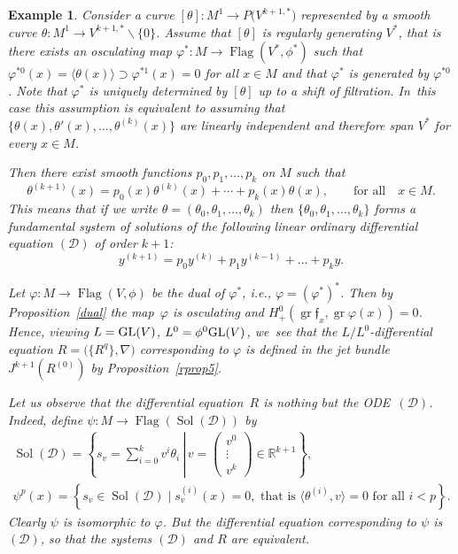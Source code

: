 \documentclass[pdftex]{sigma}%
\newcommand{\R}{\mathbb R}
\newcommand{\cD}{\mathcal D}
\newcommand{\cR}{R}
\newcommand{\f}{\mathfrak f}
\newcommand{\Flag}{\operatorname{Flag}}
\newcommand{\Sol}{\operatorname{Sol}}
\newcommand{\gr}{\operatorname{gr}}
\newtheorem{ex}[thm]{Example}
\numberwithin{equation}{section}
\begin{document}
\begin{ex}\label{ex4new} Consider a curve $[\theta]\colon M^1\to P\big(V^{k+1,*}\big)$ represented by a smooth curve $\theta\colon M^1\to V^{k+1,*}\backslash \{0\}$. Assume that $[\theta]$ is regularly generating $V^*$, that is there exists an osculating map $\varphi^*\colon M\to \Flag(V^*,\phi^*)$ such that $\varphi^{*0}(x) = \langle \theta(x) \rangle\supset \varphi^{*1}(x)=0$ for all $x\in M$ and that $\varphi^*$ is generated by $\varphi^{*0}$. Note that $\varphi^*$ is uniquely determined by $[\theta]$ up to a shift of filtration. In~this case this assumption is equivalent to assuming that $\big\{\theta(x), \theta'(x),\dots, \theta^{(k)}(x)\big\}$ are linearly independent and therefore span $V^*$ for every $x\in M$.

Then there exist smooth functions $p_0,p_1,\dots,p_k$ on $M$ such that
\[
\theta^{(k+1)}(x) = p_0(x)\theta^{(k)}(x) + \cdots + p_k(x)\theta(x),\qquad \text{for all}\quad x\in M.
\]
This means that if we write $\theta=(\theta_0,\theta_1,\dots,\theta_k)$ then $\{\theta_0,\theta_1,\dots,\theta_k\}$ forms a fundamental system of solutions of the following linear ordinary differential equation $(\cD)$ of order $k+1$:
\begin{equation*}
y^{(k+1)} = p_0 y^{(k)} + p_1y^{(k-1)} + \dots + p_k y.\tag{$\cD$}
\end{equation*}

Let $\varphi\colon M\to\Flag(V,\phi)$ be the dual of $\varphi^*$, i.e., $\varphi = (\varphi^*)^*$. Then by Proposition~\ref{dual} the map~$\varphi$ is osculating and $H^0_{+}(\gr \f_x,\gr\varphi(x))=0$. Hence, viewing $L={\rm GL}(V)$, $L^0=\phi^0{\rm GL}(V)$, we~see that the $L/L^0$-differential equation $\cR=\big(\{\cR^q\},\nabla\big)$ corresponding to $\varphi$ is defined in the jet bundle $J^{k+1}(\cR^{(0)})$ by Proposition~\ref{rprop5}.

Let us observe that the differential equation~$\cR$ is nothing but the ODE~$(\cD)$. Indeed, define $\psi \colon M\to \Flag(\Sol(\cD))$ by
\begin{gather*}
\Sol(\cD) = \left\{s_v = \sum_{i=0}^k v^i\theta_i\,\left|\,v=\begin{pmatrix} v^0 \\[-1mm] \vdots \\ v^k \end{pmatrix} \in \R^{k+1}\right.\right\},
\\[.5ex]
\psi^p(x) = \left\{s_v\in \Sol(\cD)\mid s^{(i)}_v(x)=0,\text{ that is }
\big\langle \theta^{(i)},v \big\rangle = 0 \text{ for all } i<p \right\}.
\end{gather*}
Clearly $\psi$ is isomorphic to $\varphi$. But the differential equation corresponding to $\psi$ is~$(\cD)$, so that the systems $(\cD)$ and $\cR$ are equivalent.


\end{ex}
\end{document}
